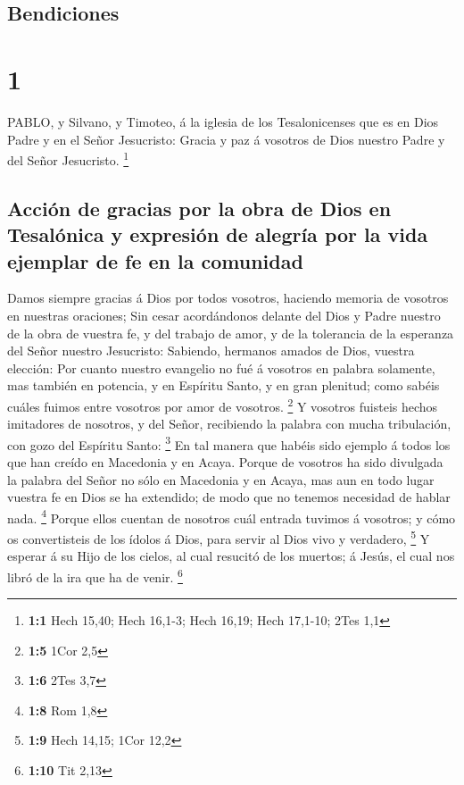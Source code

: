 \hypertarget{bendiciones}{%
\subsection{Bendiciones}\label{bendiciones}}

\hypertarget{section}{%
\section{1}\label{section}}

 PABLO, y Silvano, y Timoteo, á la iglesia de los
Tesalonicenses que es en Dios Padre y en el Señor Jesucristo: Gracia y
paz á vosotros de Dios nuestro Padre y del Señor Jesucristo. \footnote{\textbf{1:1}
  Hech 15,40; Hech 16,1-3; Hech 16,19; Hech 17,1-10; 2Tes 1,1}

\hypertarget{acciuxf3n-de-gracias-por-la-obra-de-dios-en-tesaluxf3nica-y-expresiuxf3n-de-alegruxeda-por-la-vida-ejemplar-de-fe-en-la-comunidad}{%
\subsection{Acción de gracias por la obra de Dios en Tesalónica y
expresión de alegría por la vida ejemplar de fe en la
comunidad}\label{acciuxf3n-de-gracias-por-la-obra-de-dios-en-tesaluxf3nica-y-expresiuxf3n-de-alegruxeda-por-la-vida-ejemplar-de-fe-en-la-comunidad}}

 Damos siempre gracias á Dios por todos vosotros, haciendo
memoria de vosotros en nuestras oraciones;  Sin cesar
acordándonos delante del Dios y Padre nuestro de la obra de vuestra fe,
y del trabajo de amor, y de la tolerancia de la esperanza del Señor
nuestro Jesucristo:  Sabiendo, hermanos amados de Dios,
vuestra elección:  Por cuanto nuestro evangelio no fué á
vosotros en palabra solamente, mas también en potencia, y en Espíritu
Santo, y en gran plenitud; como sabéis cuáles fuimos entre vosotros por
amor de vosotros. \footnote{\textbf{1:5} 1Cor 2,5}  Y
vosotros fuisteis hechos imitadores de nosotros, y del Señor, recibiendo
la palabra con mucha tribulación, con gozo del Espíritu Santo:
\footnote{\textbf{1:6} 2Tes 3,7}  En tal manera que habéis
sido ejemplo á todos los que han creído en Macedonia y en Acaya.
 Porque de vosotros ha sido divulgada la palabra del Señor
no sólo en Macedonia y en Acaya, mas aun en todo lugar vuestra fe en
Dios se ha extendido; de modo que no tenemos necesidad de hablar nada.
\footnote{\textbf{1:8} Rom 1,8}  Porque ellos cuentan de
nosotros cuál entrada tuvimos á vosotros; y cómo os convertisteis de los
ídolos á Dios, para servir al Dios vivo y verdadero, \footnote{\textbf{1:9}
  Hech 14,15; 1Cor 12,2}  Y esperar á su Hijo de los
cielos, al cual resucitó de los muertos; á Jesús, el cual nos libró de
la ira que ha de venir. \footnote{\textbf{1:10} Tit 2,13}

